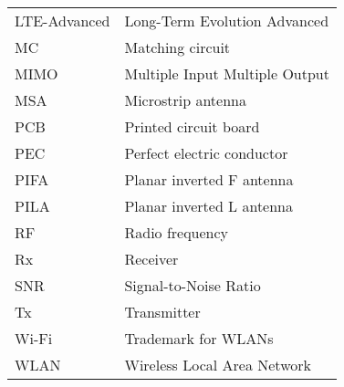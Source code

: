 \begin{tabular}{ll}
LTE-Advanced & Long-Term Evolution Advanced\\
MC          & Matching circuit\\
MIMO        & Multiple Input Multiple Output \\
MSA         & Microstrip antenna\\
PCB         & Printed circuit board\\
PEC         & Perfect electric conductor\\
PIFA        & Planar inverted F antenna\\
PILA        & Planar inverted L antenna\\
RF          & Radio frequency\\
Rx          & Receiver \\
SNR         & Signal-to-Noise Ratio \\
Tx          & Transmitter \\
Wi-Fi       & Trademark for WLANs \\
WLAN        & Wireless Local Area Network \\
\end{tabular}
